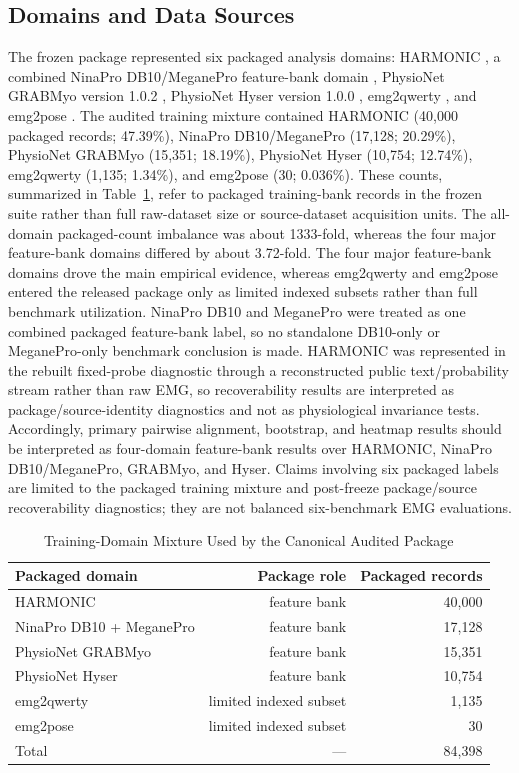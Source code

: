 \documentclass[journal]{IEEEtran}
\begin{document}
\subsection{Domains and Data Sources}
The frozen package represented six packaged analysis domains: HARMONIC \cite{newman2022harmonic}, a combined NinaPro DB10/MeganePro feature-bank domain \cite{atzori2014ninapro,giordaniello2017meganepro}, PhysioNet GRABMyo version 1.0.2 \cite{pradhan2022grabmyo}, PhysioNet Hyser version 1.0.0 \cite{jiang2021hyser}, emg2qwerty \cite{sivakumar2024emg2qwerty}, and emg2pose \cite{salter2024emg2pose}. The audited training mixture contained HARMONIC (40{,}000 packaged records; 47.39\%), NinaPro DB10/MeganePro (17{,}128; 20.29\%), PhysioNet GRABMyo (15{,}351; 18.19\%), PhysioNet Hyser (10{,}754; 12.74\%), emg2qwerty (1{,}135; 1.34\%), and emg2pose (30; 0.036\%). These counts, summarized in Table~\ref{tab:domains}, refer to packaged training-bank records in the frozen suite rather than full raw-dataset size or source-dataset acquisition units. The all-domain packaged-count imbalance was about 1333-fold, whereas the four major feature-bank domains differed by about 3.72-fold. The four major feature-bank domains drove the main empirical evidence, whereas emg2qwerty and emg2pose entered the released package only as limited indexed subsets rather than full benchmark utilization. NinaPro DB10 and MeganePro were treated as one combined packaged feature-bank label, so no standalone DB10-only or MeganePro-only benchmark conclusion is made. HARMONIC was represented in the rebuilt fixed-probe diagnostic through a reconstructed public text/probability stream rather than raw EMG, so recoverability results are interpreted as package/source-identity diagnostics and not as physiological invariance tests. Accordingly, primary pairwise alignment, bootstrap, and heatmap results should be interpreted as four-domain feature-bank results over HARMONIC, NinaPro DB10/MeganePro, GRABMyo, and Hyser. Claims involving six packaged labels are limited to the packaged training mixture and post-freeze package/source recoverability diagnostics; they are not balanced six-benchmark EMG evaluations.

\begin{table}[t]
\caption{Training-Domain Mixture Used by the Canonical Audited Package}
\label{tab:domains}
\centering
\footnotesize
\begin{tabular}{@{}lrr@{}}
\toprule
Packaged domain & Package role & Packaged records \\
\midrule
HARMONIC & feature bank & 40{,}000 \\
NinaPro DB10 + MeganePro & feature bank & 17{,}128 \\
PhysioNet GRABMyo & feature bank & 15{,}351 \\
PhysioNet Hyser & feature bank & 10{,}754 \\
emg2qwerty & limited indexed subset & 1{,}135 \\
emg2pose & limited indexed subset & 30 \\
\midrule
Total & --- & 84{,}398 \\
\bottomrule
\end{tabular}
\end{table}
\end{document}
